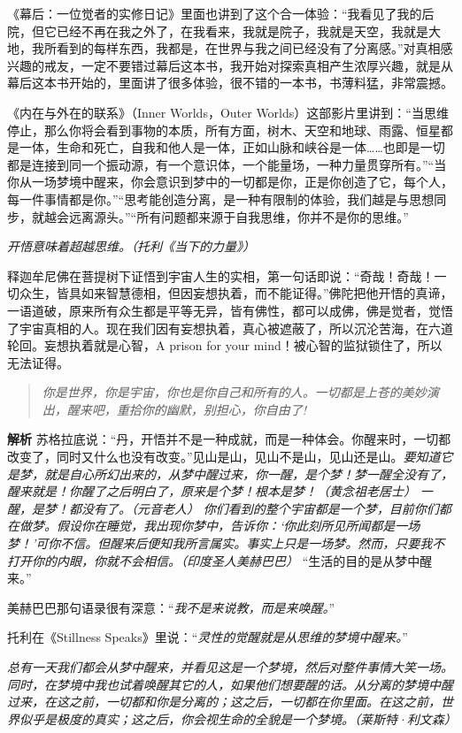 《幕后：一位觉者的实修日记》里面也讲到了这个合一体验：“我看见了我的后院，但它已经不再在我之外了，在我看来，我就是院子，我就是天空，我就是大地，我所看到的每样东西，我都是，在世界与我之间已经没有了分离感。”对真相感兴趣的戒友，一定不要错过幕后这本书，我开始对探索真相产生浓厚兴趣，就是从幕后这本书开始的，里面讲了很多体验，很不错的一本书，书薄料猛，非常震撼。

《内在与外在的联系》（Inner Worlds，Outer Worlds）这部影片里讲到：“当思维停止，那么你将会看到事物的本质，所有方面，树木、天空和地球、雨露、恒星都是一体，生命和死亡，自我和他人是一体，正如山脉和峡谷是一体……也即是一切都是连接到同一个振动源，有一个意识体，一个能量场，一种力量贯穿所有。”“当你从一场梦境中醒来，你会意识到梦中的一切都是你，正是你创造了它，每个人，每一件事情都是你。”“思考能创造分离，是一种有限制的体验，我们越是与思想同步，就越会远离源头。”“所有问题都来源于自我思维，你并不是你的思维。”

\textit{开悟意味着超越思维。（托利《当下的力量》）}

释迦牟尼佛在菩提树下证悟到宇宙人生的实相，第一句话即说：“奇哉！奇哉！一切众生，皆具如来智慧德相，但因妄想执着，而不能证得。”佛陀把他开悟的真谛，一语道破，原来所有众生都是平等无异，皆有佛性，都可以成佛，佛是觉者，觉悟了宇宙真相的人。现在我们因有妄想执着，真心被遮蔽了，所以沉沦苦海，在六道轮回。妄想执着就是心智，A prison for your mind！被心智的监狱锁住了，所以无法证得。

\begin{quote}\it
    你是世界，你是宇宙，你也是你自己和所有的人。一切都是上苍的美妙演出，醒来吧，重拾你的幽默，别担心，你自由了!
\end{quote}

\textbf{解析} 苏格拉底说：“丹，开悟并不是一种成就，而是一种体会。你醒来时，一切都改变了，同时又什么也没有改变。”见山是山，见山不是山，见山还是山。\textit{要知道它是梦，就是自心所幻出来的，从梦中醒过来，你一醒，是个梦！梦一醒全没有了，醒来就是！你醒了之后明白了，原来是个梦！根本是梦！（黄念祖老居士）} \textit{一醒，是梦！都没有了。（元音老人）} \textit{你们看到的整个宇宙都是一个梦，目前你们都在做梦。假设你在睡觉，我出现你梦中，告诉你：‘你此刻所见所闻都是一场梦！’可你不信。但醒来后便知我所言属实。事实上只是一场梦。然而，只要我不打开你的内眼，你就不会相信。（印度圣人美赫巴巴）} “生活的目的是从梦中醒来。”

美赫巴巴那句语录很有深意：“\textit{我不是来说教，而是来唤醒。}”

托利在《Stillness Speaks》里说：“\textit{灵性的觉醒就是从思维的梦境中醒来。}”

\textit{总有一天我们都会从梦中醒来，并看见这是一个梦境，然后对整件事情大笑一场。同时，在梦境中我也试着唤醒其它的人，如果他们想要醒的话。从分离的梦境中醒过来，在这之前，一切都和你是分离的；这之后，一切都在你里面。在这之前，世界似乎是极度的真实；这之后，你会视生命的全貌是一个梦境。（莱斯特·利文森）}

